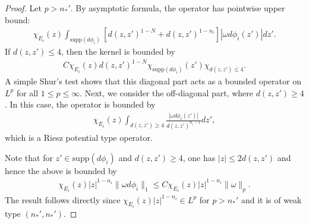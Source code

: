 \documentclass[12pt]{amsart}
\begin{document}
\begin{proof}
Let $p>n_*'$. By asymptotic formula, the operator has pointwise upper bound:
\begin{align*}
    \chi_{E_i}(z) \int_{\textrm{supp}(d\phi_i)} \left[ d(z,z')^{1-N} + d(z,z')^{1-n_i} \right] |\omega d\phi_i(z')| dz'.
\end{align*}
If $d(z,z')\le 4$, then the kernel is bounded by
\begin{align*}
    C\chi_{E_i}(z) d(z,z')^{1-N} \chi_{\textrm{supp}(d\phi_i)}(z') \chi_{d(z,z')\le 4}.
\end{align*}
A simple Shur's test shows that this diagonal part acts as a bounded operator on $L^p$ for all $1\le p\le \infty$. Next, we consider the off-diagonal part, where $d(z,z')\ge 4$. In this case, the operator is bounded by
\begin{align*}
    \chi_{E_i}(z) \int_{d(z,z')\ge 4} \frac{|\omega d\phi_i(z')|}{d(z,z')^{n_i-1}} dz',
\end{align*}
which is a Riesz potential type operator.

Note that for $z'\in \textrm{supp}(d\phi_i)$ and $d(z,z')\ge 4$, one has $|z|\le 2d(z,z')$ and hence the above is bounded by
\begin{align*}
    \chi_{E_i}(z) |z|^{1-n_i} \|\omega d\phi_i\|_1 \le C \chi_{E_i}(z) |z|^{1-n_i} \|\omega\|_p.
\end{align*}
The result follows directly since $\chi_{E_i}(z) |z|^{1-n_i} \in L^p$ for $p>n_*'$ and it is of weak type $(n_*', n_*')$.



\end{proof}
\end{document}
